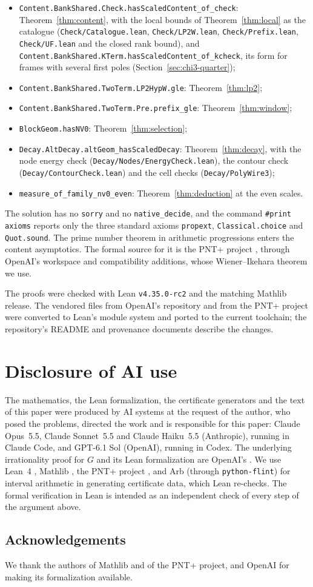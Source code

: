 \documentclass[11pt]{amsart}
\theoremstyle{definition}
\theoremstyle{remark}
\numberwithin{equation}{section}
\newcommand{\lean}[1]{\nolinkurl{#1}}
\begin{document}
\begin{itemize}
\item \lean{Content.BankShared.Check.hasScaledContent_of_check}: Theorem~\ref{thm:content}, with the local bounds of
 Theorem~\ref{thm:local} as the catalogue (\lean{Check/Catalogue.lean}, \lean{Check/LP2W.lean}, \lean{Check/Prefix.lean},
 \lean{Check/UF.lean} and the closed rank bound), and \lean{Content.BankShared.KTerm.hasScaledContent_of_kcheck}, its form
 for frames with several first poles (Section~\ref{sec:chi3-quarter});
\item \lean{Content.BankShared.TwoTerm.LP2HypW.gle}: Theorem~\ref{thm:lp2};
\item \lean{Content.BankShared.TwoTerm.Pre.prefix_gle}: Theorem~\ref{thm:window};
\item \lean{BlockGeom.hasNV0}: Theorem~\ref{thm:selection};
\item \lean{Decay.AltDecay.altGeom_hasScaledDecay}: Theorem~\ref{thm:decay}, with the node energy check
 (\lean{Decay/Nodes/EnergyCheck.lean}), the contour check (\lean{Decay/ContourCheck.lean}) and the cell checks
 (\lean{Decay/PolyWire3});
\item \lean{measure_of_family_nv0_even}: Theorem~\ref{thm:deduction} at the even scales.
\end{itemize}
The solution has no \lean{sorry} and no \lean{native_decide}, and the command \texttt{\#print axioms} reports only the
three standard axioms \lean{propext}, \lean{Classical.choice} and \lean{Quot.sound}. The prime number theorem in arithmetic
progressions enters the content asymptotics. The formal source for it is the PNT+ project \cite{PNTPlus}, through
OpenAI's workspace and compatibility additions, whose Wiener--Ikehara theorem we use.

The proofs were checked with Lean \texttt{v4.35.0-rc2} and the matching Mathlib release. The vendored files from OpenAI's
repository and from the PNT+ project were converted to Lean's module system and ported to the current toolchain; the
repository's README and provenance documents describe the changes.

\section*{Disclosure of AI use}

The mathematics, the Lean formalization, the certificate generators and the text of this paper were produced by AI systems at the request of the author, who posed the problems, directed the work and is responsible for this paper: Claude Opus~5.5, Claude Sonnet~5.5 and Claude Haiku~5.5 (Anthropic), running in Claude Code, and GPT-6.1 Sol (OpenAI), running in Codex. The underlying irrationality proof for $G$ and its Lean formalization are OpenAI's \cite{OpenAI2026}. We use Lean~4
\cite{Lean4}, Mathlib \cite{Mathlib}, the PNT+ project \cite{PNTPlus}, and Arb \cite{Arb} (through
\texttt{python-flint}) for interval arithmetic in generating certificate data, which Lean re-checks. The formal
verification in Lean is intended as an independent check of every step of the argument above.

\subsection*{Acknowledgements}
We thank the authors of Mathlib and of the PNT+ project, and OpenAI for making its formalization available.



\end{document}
